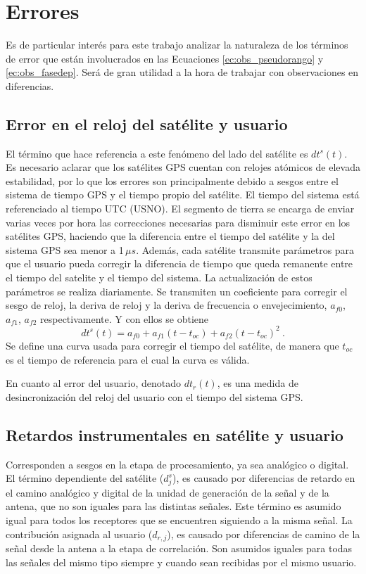 \documentclass[a4paper,12pt,oneside,onecolumn,final,openright]{book}%
\begin{document}
\section{Errores}\label{sec:errores}
	Es de particular interés para este trabajo analizar la naturaleza de los términos de error que están involucrados en las Ecuaciones \eqref{ec:obs_pseudorango} y \eqref{ec:obs_fasedep}. Será de gran utilidad a la hora de trabajar con observaciones en diferencias. 
\subsection*{Error en el reloj del satélite y usuario}
	El término que hace referencia a este fenómeno del lado del satélite es $dt^s(t)$. Es necesario aclarar que los satélites GPS cuentan con relojes atómicos de elevada estabilidad, por lo que los errores son principalmente debido a sesgos entre el sistema de tiempo GPS y el tiempo propio del satélite. El tiempo del sistema está referenciado al tiempo UTC (USNO). El segmento de tierra se encarga de enviar varias veces por hora las correcciones necesarias para disminuir este error en los satélites GPS, haciendo que la diferencia entre el tiempo del satélite y la del sistema GPS sea menor a 1\,$\mu s$. Además, cada satélite transmite parámetros para que el usuario pueda corregir la diferencia de tiempo que queda remanente entre el tiempo del satelite y el tiempo del sistema. La actualización de estos parámetros se realiza diariamente. Se transmiten un coeficiente para corregir el sesgo de reloj, la deriva de reloj y la deriva de frecuencia o envejecimiento, $a_{f0}$, $a_{f1}$, $a_{f2}$ respectivamente. Y con ellos se obtiene 
\begin{equation}\label{ec:corr_satclk}
	dt^s(t) = a_{f0} + a_{f1}(t-t_{oc}) + a_{f2}(t-t_{oc})^2 \ .
\end{equation}
	Se define una curva usada para corregir el tiempo del satélite, de manera que $t_{oc}$ es el tiempo de referencia para el cual la curva es válida.
	
	En cuanto al error del usuario, denotado $dt_r(t)$, es una medida de desincronización del reloj del usuario con el tiempo del sistema GPS.
\subsection*{Retardos instrumentales en satélite y usuario}
	Corresponden a sesgos en la etapa de procesamiento, ya sea analógico o digital. El término dependiente del satélite ($d_j^s$), es causado por diferencias de retardo en el camino analógico y digital de la unidad de generación de la señal y de la antena, que no son iguales para las distintas señales. Este término es asumido igual para todos los receptores que se encuentren siguiendo a la misma señal. La contribución asignada al usuario ($d_{r,j}$), es causado por diferencias de camino de la señal desde la antena a la etapa de correlación. Son asumidos iguales para todas las señales del mismo tipo siempre y cuando sean recibidas por el mismo usuario.
	
\end{document}
